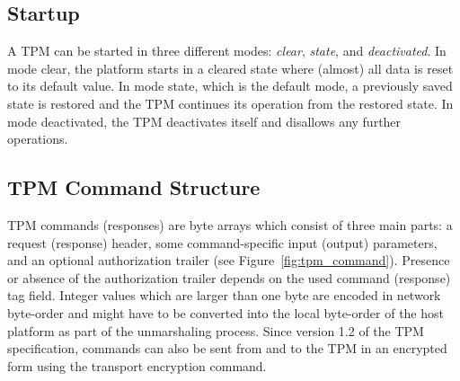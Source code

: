 \documentclass[runningheads]{llncs}
\begin{document}
\subsection{Startup}
A TPM can be started in three different modes: \emph{clear}, \emph{state},
and \emph{deactivated}. In mode clear, the platform starts in a cleared state
where (almost) all data is reset to its default value. In mode state, which
is the default mode, a previously saved state is restored and the TPM
continues its operation from the restored state. In mode deactivated, the
TPM deactivates itself and disallows any further operations.



\subsection{TPM Command Structure}
TPM commands (responses) are byte arrays which consist of three main parts:
a request (response) header, some command-specific input (output) parameters,
and an optional authorization trailer (see Figure~\ref{fig:tpm_command}).
Presence or absence of the authorization trailer depends on the used command
(response) tag field. Integer values which are larger than one byte are
encoded in network byte-order and might have to be converted into the local
byte-order of the host platform as part of the unmarshaling process. Since
version 1.2 of the TPM specification, commands can also be sent from and to
the TPM in an encrypted form using the transport encryption command.
\end{document}
